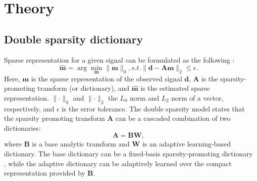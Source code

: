 



\section{Theory}
\subsection{Double sparsity dictionary}
Sparse representation for a given signal  can be formulated as the following  \cite[]{ron2010,ophir2011}:
\begin{equation}
\label{eq:eq1}
\hat{\mathbf{m}} = \arg \min_{\mathbf{m}} \parallel\mathbf{m} \parallel_0, s.t. \parallel \mathbf{d}-\mathbf{A}\mathbf{m}\parallel_2 \le \epsilon.
\end{equation}
Here, $\mathbf{m}$ is the sparse representation of the observed signal $\mathbf{d}$, $\mathbf{A}$ is the sparsity-promoting transform (or dictionary), and $\hat{\mathbf{m}}$ is the estimated sparse representation.
$\parallel \cdot \parallel_0$ and $\parallel \cdot \parallel_2$  the $L_0$ norm and $L_2$ norm of a vector, respectively, and $\epsilon$ is the error tolerance.
The double sparsity model states that the sparsity promoting transform $\mathbf{A}$ can be  a cascaded combination of two dictionaries:
\begin{equation}
\label{eq:eq2}
\mathbf{A} = \mathbf{BW},
\end{equation}
where $\mathbf{B}$ is a base analytic transform and $\mathbf{W}$ is an adaptive learning-based dictionary.  The base dictionary can be a fixed-basis sparsity-promoting dictionary\dlo{ }%
, while the adaptive dictionary can be adaptively learned over the compact representation provided by $\mathbf{B}$. 

